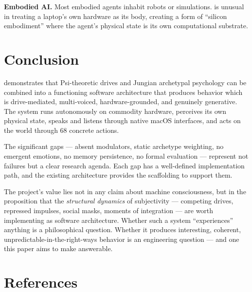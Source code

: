 \documentclass[11pt,oneside]{article}
\begin{document}
\textbf{Embodied AI.}
Most embodied agents inhabit robots or simulations.
\sociopsi{} is unusual in treating a laptop's own hardware as its body, creating a form of ``silicon embodiment'' where the agent's physical state is its own computational substrate.


\section{Conclusion}
\label{sec:conclusion}

\sociopsi{} demonstrates that Psi-theoretic drives and Jungian archetypal psychology can be combined into a functioning software architecture that produces behavior which is drive-mediated, multi-voiced, hardware-grounded, and genuinely generative.
The system runs autonomously on commodity hardware, perceives its own physical state, speaks and listens through native macOS interfaces, and acts on the world through 68 concrete actions.

The significant gaps --- absent modulators, static archetype weighting, no emergent emotions, no memory persistence, no formal evaluation --- represent not failures but a clear research agenda.
Each gap has a well-defined implementation path, and the existing architecture provides the scaffolding to support them.

The project's value lies not in any claim about machine consciousness, but in the proposition that the \emph{structural dynamics} of subjectivity --- competing drives, repressed impulses, social masks, moments of integration --- are worth implementing as software architecture.
Whether such a system ``experiences'' anything is a philosophical question.
Whether it produces interesting, coherent, unpredictable-in-the-right-ways behavior is an engineering question --- and one this paper aims to make answerable.


\section*{References}
\end{document}
